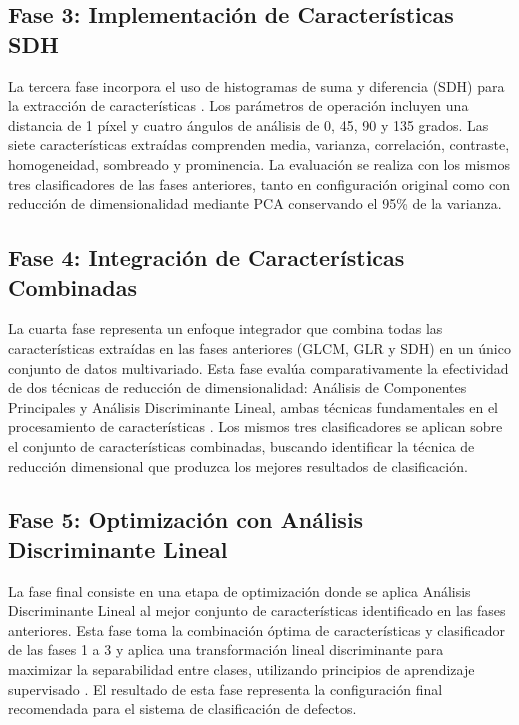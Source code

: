 \documentclass[9pt, journal]{IEEEtran}
\begin{document}
  \subsection{Fase 3: Implementación de Características SDH}

   La tercera fase incorpora el uso de histogramas de suma y diferencia
   (SDH) para la extracción de características \cite{syT0826}. Los
   parámetros de operación incluyen una distancia de 1 píxel y cuatro
   ángulos de análisis de 0, 45, 90 y 135 grados. Las siete características
   extraídas comprenden media, varianza, correlación, contraste,
   homogeneidad, sombreado y prominencia. La evaluación se realiza con los
   mismos tres clasificadores de las fases anteriores, tanto en
   configuración original como con reducción de dimensionalidad mediante PCA
   conservando el 95\% de la varianza.

  \subsection{Fase 4: Integración de Características Combinadas}

   La cuarta fase representa un enfoque integrador que combina todas las
   características extraídas en las fases anteriores (GLCM, GLR y SDH) en un
   único conjunto de datos multivariado. Esta fase evalúa comparativamente
   la efectividad de dos técnicas de reducción de dimensionalidad: Análisis
   de Componentes Principales y Análisis Discriminante Lineal, ambas
   técnicas fundamentales en el procesamiento de características
   \cite{Bishop2006}. Los mismos tres clasificadores se aplican sobre el
   conjunto de características combinadas, buscando identificar la técnica
   de reducción dimensional que produzca los mejores resultados de
   clasificación.

  \subsection{Fase 5: Optimización con Análisis Discriminante Lineal}

   La fase final consiste en una etapa de optimización donde se aplica
   Análisis Discriminante Lineal al mejor conjunto de características
   identificado en las fases anteriores. Esta fase toma la combinación
   óptima de características y clasificador de las fases 1 a 3 y aplica una
   transformación lineal discriminante para maximizar la separabilidad entre
   clases, utilizando principios de aprendizaje supervisado
   \cite{Bishop2006}. El resultado de esta fase representa la configuración
   final recomendada para el sistema de clasificación de defectos.
\end{document}
